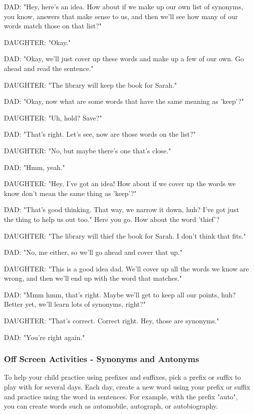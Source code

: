 DAD: "Hey, here's an idea.
How about if we make up our own list of synonyms, you know, answers that make sense to us, and then we'll see how many of our words match those on that list?"

DAUGHTER: "Okay."

DAD: "Okay, we'll just cover up these words and make up a few of our own.
Go ahead and read the sentence."

DAUGHTER: "The library will keep the book for Sarah."

DAD: "Okay, now what are some words that have the same meaning as 'keep'?"

DAUGHTER: "Uh, hold? Save?"

DAD: "That's right.
Let's see, now are those words on the list?"

DAUGHTER: "No, but maybe there's one that's close."

DAD: "Hmm, yeah."

DAUGHTER: "Hey, I've got an idea!
How about if we cover up the words we know don't mean the same thing as 'keep'?"

DAD: "That's good thinking.
That way, we narrow it down, huh?
I've got just the thing to help us out too."
Here you go.
How about the word 'thief'?

DAUGHTER: "The library will thief the book for Sarah.
I don't think that fits."

DAD: "No, me either, so we'll go ahead and cover that up."

DAUGHTER: "This is a good idea dad. We'll cover up all the words we know are wrong, and then we'll end up with the word that matches."

DAD: "Mmm hmm, that's right. Maybe we'll get to keep all our points, huh?
Better yet, we'll learn lots of synonyms, right?"

DAUGHTER: "That's correct. Correct right. Hey, those are synonyms."

DAD: "You're right again."

\subsubsection{Off Screen Activities - Synonyms and Antonyms}

To help your child practice using prefixes and suffixes, pick a prefix or suffix to play with for several days.
Each day, create a new word using your prefix or suffix and practice using the word in sentences.
For example, with the prefix "auto", you can create words such as automobile, autograph, or autobiography.

